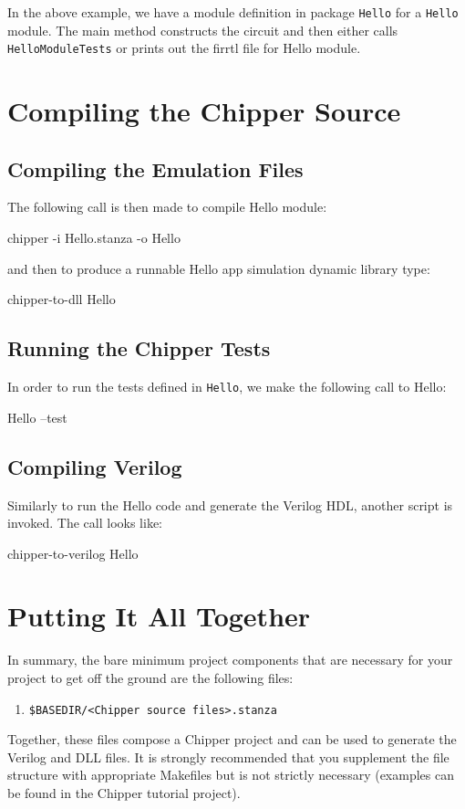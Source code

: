 In the above example, we have a module definition in package \verb+Hello+ for a \verb+Hello+ module. The main method constructs the circuit and then either calls \verb+HelloModuleTests+ or prints out the firrtl file for Hello module.

\section{Compiling the Chipper Source}

\subsection{Compiling the Emulation Files}

The following call is then made to compile Hello module:

\begin{bash}
chipper -i Hello.stanza -o Hello
\end{bash}

\noindent
and then to produce a runnable Hello app simulation dynamic library type:

\begin{bash}
chipper-to-dll Hello
\end{bash}

\subsection{Running the Chipper Tests}

In order to run the tests defined in \verb+Hello+, we make the following call to Hello:

\begin{bash}
Hello --test
\end{bash}

\subsection{Compiling Verilog}

Similarly to run the Hello code and generate the Verilog HDL, another script is invoked. The call looks like:

\begin{bash}
chipper-to-verilog Hello
\end{bash}

\section{Putting It All Together}

In summary, the bare minimum project components that are necessary for your project to get off the ground are the following files:

\begin{enumerate}
\item \verb+$BASEDIR/<Chipper source files>.stanza+
\end{enumerate}

Together, these files compose a Chipper project and can be used to generate the Verilog and DLL files. It is strongly recommended that you supplement the file structure with appropriate Makefiles but is not strictly necessary (examples can be found in the Chipper tutorial project).

